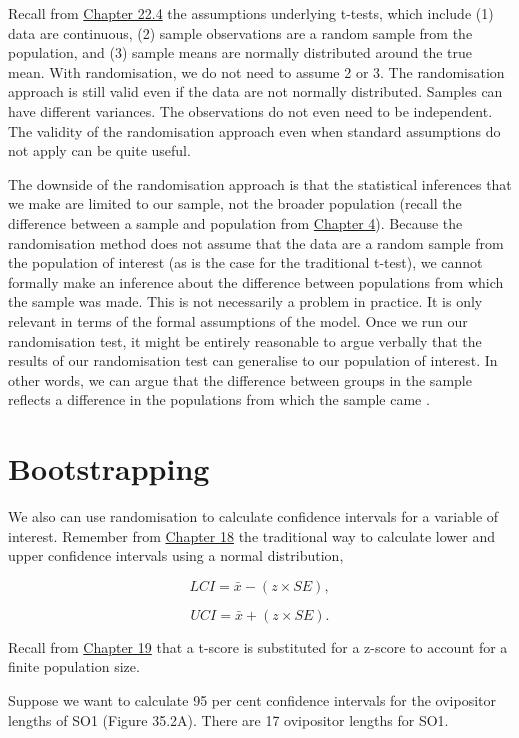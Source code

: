 \documentclass[
  openany]{scrbook}
\begin{document}
Recall from \protect\hyperlink{assumptions-of-t-tests}{Chapter 22.4} the assumptions underlying t-tests, which include (1) data are continuous, (2) sample observations are a random sample from the population, and (3) sample means are normally distributed around the true mean.
With randomisation, we do not need to assume 2 or 3.
The randomisation approach is still valid even if the data are not normally distributed.
Samples can have different variances.
The observations do not even need to be independent.
The validity of the randomisation approach even when standard assumptions do not apply can be quite useful.

The downside of the randomisation approach is that the statistical inferences that we make are limited to our sample, not the broader population (recall the difference between a sample and population from \protect\hyperlink{Chapter_4}{Chapter 4}).
Because the randomisation method does not assume that the data are a random sample from the population of interest (as is the case for the traditional t-test), we cannot formally make an inference about the difference between populations from which the sample was made.
This is not necessarily a problem in practice.
It is only relevant in terms of the formal assumptions of the model.
Once we run our randomisation test, it might be entirely reasonable to argue verbally that the results of our randomisation test can generalise to our population of interest.
In other words, we can argue that the difference between groups in the sample reflects a difference in the populations from which the sample came \citep{Ludbrook1998, Ernst2004}.

\hypertarget{bootstrapping}{%
\section{Bootstrapping}\label{bootstrapping}}

We also can use randomisation to calculate confidence intervals for a variable of interest. Remember from \protect\hyperlink{Chapter_18}{Chapter 18} the traditional way to calculate lower and upper confidence intervals using a normal distribution,

\[LCI = \bar{x} - (z \times SE),\]

\[UCI = \bar{x} + (z \times SE).\]

Recall from \protect\hyperlink{Chapter_19}{Chapter 19} that a t-score is substituted for a z-score to account for a finite population size.

Suppose we want to calculate 95 per cent confidence intervals for the ovipositor lengths of SO1 (Figure 35.2A).
There are 17 ovipositor lengths for SO1.
\end{document}
